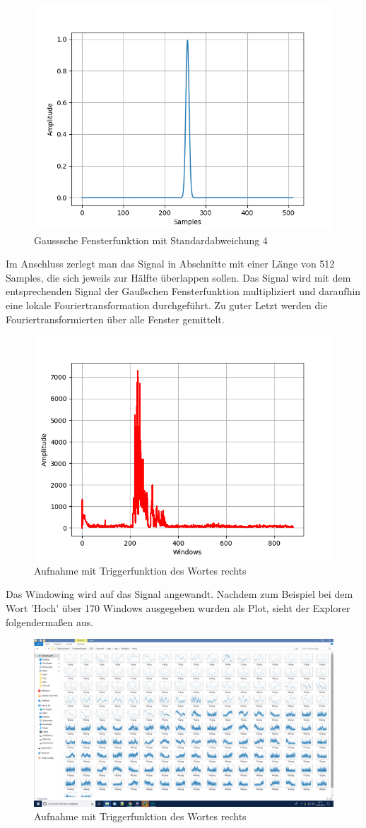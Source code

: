 \documentclass[12pt, oneside, a4paper, \docLanguage]{report}
\begin{document}
\begin{figure}[H]
	\centering
	\includegraphics[width=.6\linewidth]{../data/img/gauss.png}
	\caption{Gausssche Fensterfunktion mit Standardabweichung 4}
	\label{img:Gausssche Fensterfunktion mit Standardabweichung 4}
\end{figure}
Im Anschluss zerlegt man das Signal in Abschnitte mit einer Länge von 512 Samples, die sich jeweils zur Hälfte überlappen sollen.
Das Signal wird mit dem entsprechenden Signal der Gaußschen Fensterfunktion multipliziert und daraufhin eine lokale Fouriertransformation durchgeführt.
Zu guter Letzt werden die Fouriertransformierten über alle Fenster gemittelt.

\begin{figure}[H]
	\centering
	\includegraphics[width=.6\linewidth]{../data/img/AlleRichtig.png}
	\caption{Aufnahme mit Triggerfunktion des Wortes rechts}
	\label{img:Aufnahme mit Triggerfunktion des Wortes rechts}
\end{figure}
\newpage
Das Windowing wird auf das Signal angewandt. Nachdem zum Beispiel bei dem Wort 'Hoch' über 170 Windows ausgegeben wurden als Plot, sieht der Explorer folgendermaßen aus.
\begin{figure}[H]
	\centering
	\includegraphics[width=.8\linewidth]{../data/img/window.png}
	\caption{Aufnahme mit Triggerfunktion des Wortes rechts}
	\label{img:Aufnahme mit Triggerfunktion des Wortes rechts}
\end{figure}
\newpage
\end{document}
